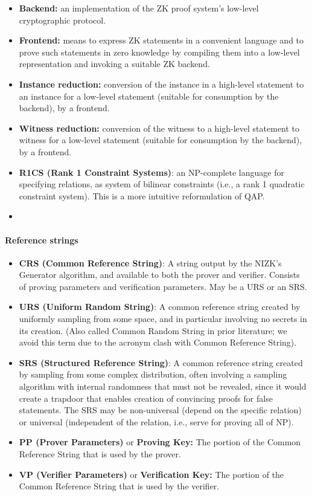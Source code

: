 \begin{itemize}[leftmargin=1em]
\item \textbf{Backend:} an implementation of the ZK proof system's low-level cryptographic protocol.
\item \textbf{Frontend:} means to express ZK statements in a convenient language and to prove such statements in zero knowledge by compiling them into a low-level representation and invoking a suitable ZK backend.
\item \textbf{Instance reduction:} conversion of the instance in a high-level statement to an instance for a low-level statement (suitable for consumption by the backend), by a frontend.
\item \textbf{Witness reduction:} conversion of the witness to a high-level statement to witness for a low-level statement (suitable for consumption by the backend), by a frontend.
\item \textbf{R1CS (Rank 1 Constraint Systems)}: an NP-complete language for specifying relations, as system of bilinear constraints (i.e., a rank 1 quadratic constraint system). This is a more intuitive reformulation of QAP.
\item {}
\end{itemize}



\paragraph[:]{Reference strings}
\begin{itemize}[leftmargin=1em]
    \item \textbf{CRS (Common Reference String)}: A string output by the NIZK's Generator algorithm, and available to both the prover and verifier. Consists of proving parameters and verification parameters. May be a URS or an SRS.
    \item \textbf{URS (Uniform Random String)}: A common reference string created by uniformly sampling from some space, and in particular involving no secrets in its creation. (Also called Common Random String in prior literature; we avoid this term due to the acronym clash with Common Reference String).
    \item \textbf{SRS (Structured Reference String)}: A common reference string created by sampling from some complex distribution, often involving a sampling algorithm with internal randomness that must not be revealed, since it would create a trapdoor that enables creation of convincing proofs for false statements. The SRS may be non-universal (depend on the specific relation) or universal (independent of the relation, i.e., serve for proving all of NP).
    \item \textbf{PP (Prover Parameters)} or \textbf{Proving Key:} The portion of the Common Reference String that is used by the prover.
    \item \textbf{VP (Verifier  Parameters)} or \textbf{Verification Key:} The portion of the Common Reference String that is used by the verifier.
\end{itemize}
